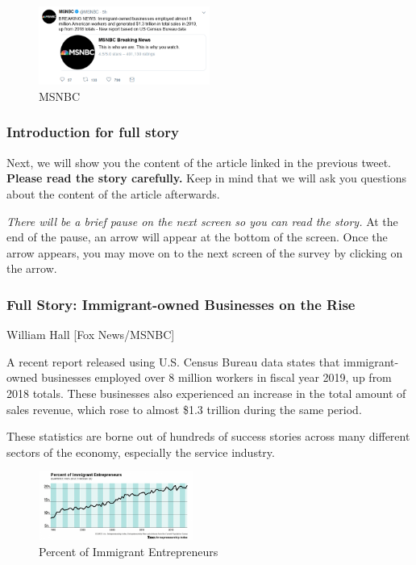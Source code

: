 \documentclass[
]{article}
\begin{document}
\begin{figure}
\centering
\includegraphics[width=0.5\textwidth,height=\textheight]{../material/tweets/msnbc_popular.png}
\caption{MSNBC}
\end{figure}

\hypertarget{introduction-for-full-story}{%
\subsubsection{Introduction for full
story}\label{introduction-for-full-story}}

Next, we will show you the content of the article linked in the previous
tweet. \textbf{Please read the story carefully.} Keep in mind that we
will ask you questions about the content of the article afterwards.

\emph{There will be a brief pause on the next screen so you can read the
story.} At the end of the pause, an arrow will appear at the bottom of
the screen. Once the arrow appears, you may move on to the next screen
of the survey by clicking on the arrow.

\hypertarget{full-story-immigrant-owned-businesses-on-the-rise}{%
\subsubsection{Full Story: Immigrant-owned Businesses on the
Rise}\label{full-story-immigrant-owned-businesses-on-the-rise}}

William Hall \textbar{} {[}Fox News/MSNBC{]}

A recent report released using U.S. Census Bureau data states that
immigrant-owned businesses employed over 8 million workers in fiscal
year 2019, up from 2018 totals. These businesses also experienced an
increase in the total amount of sales revenue, which rose to almost
\$1.3 trillion during the same period.

These statistics are borne out of hundreds of success stories across
many different sectors of the economy, especially the service industry.

\begin{figure}
\centering
\includegraphics[width=0.45\textwidth,height=\textheight]{../material/fig/immig_entrepreneurs.png}
\caption{Percent of Immigrant Entrepreneurs}
\end{figure}
\end{document}
